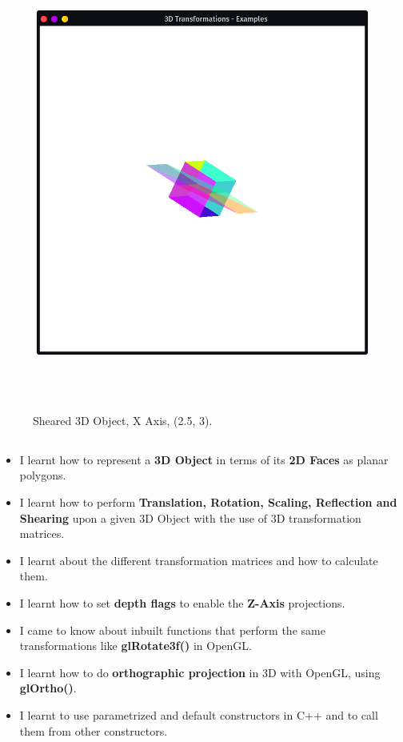 \documentclass[12pt, a4]{article}
\begin{document}
\subsection*{}
\begin{figure}[h]
\centering
\caption{Sheared 3D Object, X Axis, (2.5, 3).}
\includegraphics[height=15cm, width=15cm]{Outputs/Output-5.png}
\end{figure}




\newpage
\subsection*{}
\begin{itemize}
\item I learnt how to represent a \textbf{3D Object} in terms of its \textbf{2D Faces} as planar polygons.
\item I learnt how to perform \textbf{Translation, Rotation, Scaling, Reflection and Shearing} upon a given 3D Object with the use of 3D transformation matrices.
\item I learnt about the different transformation matrices and how to calculate them.
\item I learnt how to set \textbf{depth flags} to enable the \textbf{Z-Axis} projections.
\item I came to know about inbuilt functions that perform the same transformations like \textbf{glRotate3f()} in OpenGL.
\item I learnt how to do \textbf{orthographic projection} in 3D with OpenGL, using \textbf{glOrtho()}.
\item I learnt to use parametrized and default constructors in C++ and to call them from other constructors.
\end{itemize}
\end{document}

